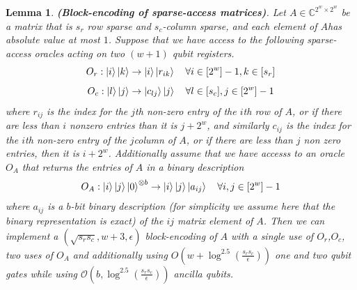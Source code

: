 \documentclass[12pt, oneside]{book}
\newtheorem{lemma}[theorem]{Lemma}
\theoremstyle{definition}
\theoremstyle{definition}
\theoremstyle{remark}
\begin{document}
\begin{lemma}
    \textbf{(Block-encoding of sparse-access matrices)}. Let $A\in \mathbb{C}^{2^w\times 2^w}$ be a matrix that is $s_r$ row sparse and $s_c$-column sparse, and each element of $A$has absolute value at most $1$. Suppose that we have access to the following sparse-access oracles acting on two $(w+1)$ qubit registers.
    \[
    O_r:\ket{i}\ket{k}\rightarrow \ket{i}\ket{r_{ik}}\quad \forall i\in[2^w]-1,k\in[s_r]
    \]
    \[
    O_c:\ket{l}\ket{j}\rightarrow \ket{c_{lj}}\ket{j}\quad \forall l \in [s_c],j\in[2^w]-1
    \]
    where $r_{ij}$ is the index for the $j$th non-zero entry of the $i$th row of $A$, or if there are less than $i$ nonzero entries than it is $j+2^w$, and similarly $c_{ij}$ is the index for the $i$th non-zero entry  of the $j$column of $A$, or if there are less than $j$ non zero entries, then it is $i+2^w$. Additionally assume that we have accesss to an oracle $O_A$ that returns the entries of $A$ in a binary description
    \[
    O_A:\ket{i}\ket{j}\ket{0}^{\otimes b}\rightarrow \ket{i}\ket{j}\ket{a_{ij}}\quad \forall i,j\in[2^w]-1
    \]
    where $a_{ij}$ is a $b$-bit binary description (for simplicity we assume here that the binary representation is exact) of the $ij$ matrix element of $A$. Then we can implement a $(\sqrt{s_rs_c},w+3,\epsilon)$ block-encoding of $A$ with a single use of $O_r$,$O_c$, two uses of $O_A$ and additionally using $O(w+\log^{2.5}\left(\frac{s_rs_c}{\epsilon}\right))$ one and two qubit gates while using $\mathcal{O}(b,\log^{2.5}\left(\frac{s_rs_c}{\epsilon}\right))$ ancilla qubits.
\end{lemma}
\end{document}
